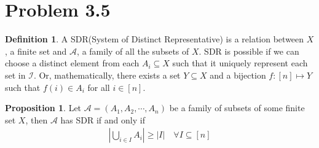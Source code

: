 \documentclass[]{article}
\theoremstyle{definition}
\newtheorem{prop}{Proposition}[section]  %
\newtheorem{definition}{Definition}
\begin{document}
\section{Problem 3.5}
    \begin{definition}
        A SDR(System of Distinct Representative) is a relation between $X$, a finite set and $\mathcal A$, a family of all the subsets of $X$. SDR is possible if we can choose a distinct element from each $A_i\subseteq X$ such that it uniquely represent each set in $\mathcal I$. Or, mathematically, there exists a set $Y\subseteq X$ and a bijection $f: [n]\mapsto Y$ such that $f(i) \in A_i$ for all $i\in [n]$. 

    \end{definition}
    \begin{prop}
        Let $\mathcal A = (A_1, A_2, \cdots, A_n)$ be a family of subsets of some finite set $X$, then $\mathcal A$ has SDR if and only if
        \begin{align}
            \left|
                \bigcup_{i \in I}A_i
            \right|
            \ge |I| \quad\forall I \subseteq [n]
        \end{align}
    \end{prop}
\end{document}
